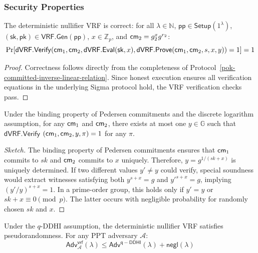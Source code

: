 \subsubsection{Security Properties}

\begin{theorem}[Correctness]
The deterministic nullifier VRF is correct: for all $\lambda \in \mathbb{N}$, $\mathsf{pp} \in \mathsf{Setup}(1^\lambda)$, $(\mathsf{sk}, \mathsf{pk}) \in \mathsf{VRF.Gen}(\mathsf{pp})$, $x \in \mathbb{Z}_p$, and $\mathsf{cm}_2 = g_2^{x} g^{r_2}$:
\[
\Pr[\mathsf{dVRF.Verify}(\mathsf{cm}_1, \mathsf{cm}_2, \mathsf{dVRF.Eval}(\mathsf{sk}, x), \mathsf{dVRF.Prove}(\mathsf{cm}_1, \mathsf{cm}_2, s, x, y)) = 1] = 1
\]
\end{theorem}

\begin{proof}
Correctness follows directly from the completeness of Protocol~\ref{pok-committed-inverse-linear-relation}. Since honest execution ensures all verification equations in the underlying Sigma protocol hold, the VRF verification checks pass.
\end{proof}

\begin{theorem}[Uniqueness]
Under the binding property of Pedersen commitments and the discrete logarithm assumption, for any $\mathsf{cm}_1$ and $\mathsf{cm}_2$, there exists at most one $y \in \mathbb{G}$ such that $\mathsf{dVRF.Verify}$ $(\mathsf{cm}_1, \mathsf{cm}_2, y, \pi) = 1$ for any $\pi$.
\end{theorem}

\begin{proof}[Sketch]
The binding property of Pedersen commitments ensures that $\mathsf{cm}_1$ commits to $sk$ and $\mathsf{cm}_2$ commits to $x$ uniquely. Therefore, $y = g^{1/(sk + x)}$ is uniquely determined. If two different values $y' \neq y$ could verify, special soundness would extract witnesses satisfying both $y^{s+x} = g$ and $y'^{s+x} = g$, implying $(y'/y)^{s+x} = 1$. In a prime-order group, this holds only if $y' = y$ or $sk + x \equiv 0 \pmod{p}$. The latter occurs with negligible probability for randomly chosen $sk$ and $x$.
\end{proof}

\begin{theorem}[Pseudorandomness]
Under the $q$-DDHI assumption, the deterministic nullifier VRF satisfies pseudorandomness. For any PPT adversary $\mathcal{A}$:
\[
\mathsf{Adv}^{\mathsf{vrf}}_{\mathcal{A}}(\lambda) \leq \mathsf{Adv}^{\mathsf{q-DDHI}}(\lambda) + \mathsf{negl}(\lambda)
\]
\end{theorem}

